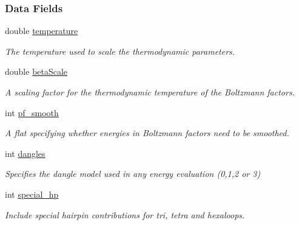 \subsubsection*{Data Fields}
\begin{DoxyCompactItemize}
\item 
\mbox{\label{group__model__details_a5f7e5c2b65bada5188443470e576aa4b}} 
double \mbox{\hyperlink{group__model__details_a5f7e5c2b65bada5188443470e576aa4b}{temperature}}
\begin{DoxyCompactList}\small\item\em The temperature used to scale the thermodynamic parameters. \end{DoxyCompactList}\item 
\mbox{\label{group__model__details_a19524bf1d8d7ab590ed36edbbcaaba2c}} 
double \mbox{\hyperlink{group__model__details_a19524bf1d8d7ab590ed36edbbcaaba2c}{beta\+Scale}}
\begin{DoxyCompactList}\small\item\em A scaling factor for the thermodynamic temperature of the Boltzmann factors. \end{DoxyCompactList}\item 
\mbox{\label{group__model__details_a97b9f2fa2d157c65413d33b1beb5159d}} 
int \mbox{\hyperlink{group__model__details_a97b9f2fa2d157c65413d33b1beb5159d}{pf\+\_\+smooth}}
\begin{DoxyCompactList}\small\item\em A flat specifying whether energies in Boltzmann factors need to be smoothed. \end{DoxyCompactList}\item 
int \mbox{\hyperlink{group__model__details_adcda4ff2ea77748ae0e8700288282efc}{dangles}}
\begin{DoxyCompactList}\small\item\em Specifies the dangle model used in any energy evaluation (0,1,2 or 3) \end{DoxyCompactList}\item 
\mbox{\label{group__model__details_add64a96d23e77ef1d0ddf8dfc5228143}} 
int \mbox{\hyperlink{group__model__details_add64a96d23e77ef1d0ddf8dfc5228143}{special\+\_\+hp}}
\begin{DoxyCompactList}\small\item\em Include special hairpin contributions for tri, tetra and hexaloops. \end{DoxyCompactList}\item 

\end{DoxyCompactItemize}
